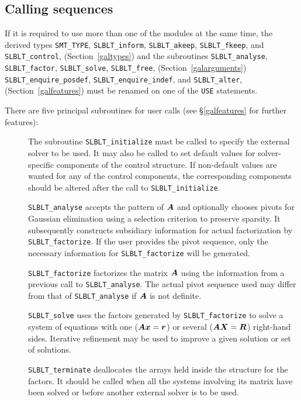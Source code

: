 \documentclass{galahad}
\newcommand{\packagename}{SLBLT}
\begin{document}
\subsection{Calling sequences}



\noindent
If it is required to use more than one of the modules at the same time, 
the derived types
{\tt SMT\_TYPE},
{\tt \packagename\_inform},
{\tt \packagename\_akeep},
{\tt \packagename\_fkeep}, and
{\tt \packagename\_control},
(Section~\ref{galtypes})
and the subroutines
{\tt \packagename\_analyse},
{\tt \packagename\_factor},
{\tt \packagename\_solve},
{\tt \packagename\_free},
(Section~\ref{galarguments})
{\tt \packagename\_enquire\_posdef},
{\tt \packagename\_enquire\_indef}, and
{\tt \packagename\_alter},
(Section~\ref{galfeatures})
must be renamed on one of the {\tt USE} statements.

\noindent There are five principal subroutines for user calls (see
\S\ref{galfeatures} for further features):

\begin{description}

\item[] The subroutine {\tt \packagename\_initialize} must be called to
specify the external solver to be used.
It may also be called to set default values
for solver-specific components of the control structure.
If non-default values are
wanted for any of the control components, the corresponding components
should be altered after the call to {\tt \packagename\_initialize}.

\item[] {\tt \packagename\_analyse} accepts the pattern of ${\bm{A}}$
 and optionally chooses pivots
 for Gaussian elimination using a selection criterion to preserve
 sparsity.  It subsequently constructs subsidiary information for
 actual factorization by {\tt \packagename\_factorize}. If the user provides
 the pivot sequence, only the necessary information for
 {\tt \packagename\_factorize} will be generated.

\item[] {\tt \packagename\_factorize} factorizes the matrix ${\bm{A}}$ using the
 information
 from a previous call to {\tt \packagename\_analyse}. The actual pivot sequence
 used may differ from that of {\tt \packagename\_analyse} if ${\bm{A}}$ is not
definite.

\item[] {\tt \packagename\_solve} uses the factors generated by
  {\tt \packagename\_factorize} to
  solve a system of equations with one (${\bm{A}} {\bm{x}} = {\bm{r}}$)
  or several (${\bm{A}} {\bm{X}} = {\bm{R}}$) right-hand sides.
  Iterative refinement may be used to improve a given solution
  or set of solutions.

\item[] {\tt \packagename\_terminate} deallocates the arrays held inside the
  structure for the factors. It should be called
  when all the systems involving its matrix have been solved
  or before another external solver is to be used.
\end{description}
\end{document}
